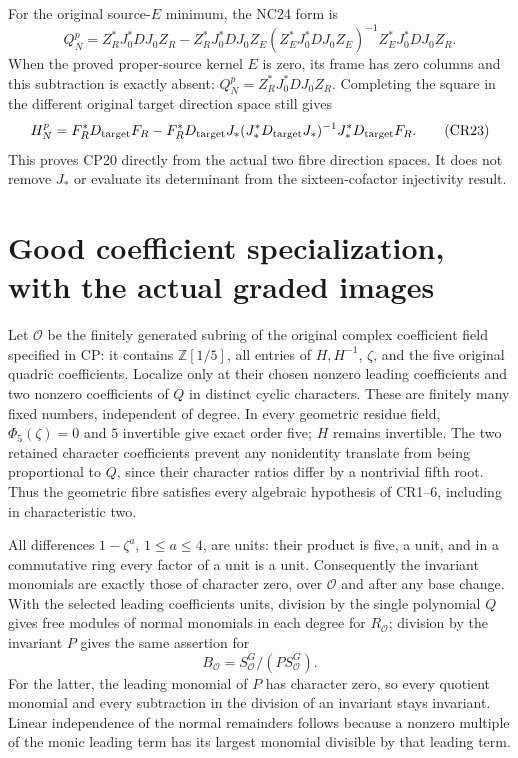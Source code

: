 For the original source-$E$ minimum, the NC24 form is
\[
 Q_N^p=Z_R^*J_0^*DJ_0Z_R
 -Z_R^*J_0^*DJ_0Z_E(Z_E^*J_0^*DJ_0Z_E)^{-1}Z_E^*J_0^*DJ_0Z_R.
\]
When the proved proper-source kernel $E$ is zero, its frame has
zero columns and this subtraction is exactly absent:
$Q_N^p=Z_R^*J_0^*DJ_0Z_R$.  Completing the square in the
different original target direction space still gives
\[
 H_N^p=F_R^*D_{\rm target}F_R
 -F_R^*D_{\rm target}J_*(J_*^*D_{\rm target}J_*)^{-1}
                         J_*^*D_{\rm target}F_R.                 \tag{CR23}
\]
This proves CP20 directly from the actual two fibre direction
spaces.  It does not remove $J_*$ or evaluate its determinant
from the sixteen-cofactor injectivity result.

\section{Good coefficient specialization, with the actual graded images}
Let $\mathcal O$ be the finitely generated subring of the original
complex coefficient field specified in CP: it contains
$\mathbb Z[1/5]$, all entries of $H,H^{-1}$, $\zeta$, and the
five original quadric coefficients.  Localize only at their chosen
nonzero leading coefficients and two nonzero coefficients of $Q$
in distinct cyclic characters.  These are finitely many fixed
numbers, independent of degree.  In every geometric residue
field, $\Phi_5(\zeta)=0$ and $5$ invertible give exact order five;
$H$ remains invertible.  The two retained character coefficients
prevent any nonidentity translate from being proportional to $Q$,
since their character ratios differ by a nontrivial fifth root.
Thus the geometric fibre satisfies every algebraic hypothesis of
CR1--6, including in characteristic two.

All differences $1-\zeta^a$, $1\le a\le4$, are units: their
product is five, a unit, and in a commutative ring every factor
of a unit is a unit.  Consequently the invariant monomials are
exactly those of character zero, over $\mathcal O$ and after any
base change.  With the selected leading coefficients units,
division by the single polynomial $Q$ gives free modules of
normal monomials in each degree for $R_\mathcal O$; division by
the invariant $P$ gives the same assertion for
\[
 B_\mathcal O=S_\mathcal O^G/(P S_\mathcal O^G).
\]
For the latter, the leading monomial of $P$ has character zero,
so every quotient monomial and every subtraction in the division
of an invariant stays invariant.  Linear independence of the
normal remainders follows because a nonzero multiple of the
monic leading term has its largest monomial divisible by that
leading term.


